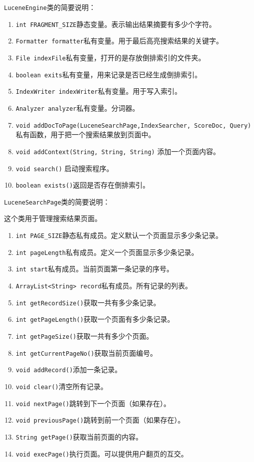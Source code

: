 \documentclass[UTF8,a4paper,12pt]{ctexart}
\begin{document}
\texttt{LuceneEngine}类的简要说明：
\begin{enumerate}[label=(\arabic*), wide=2em]
    \item \texttt{int FRAGMENT_SIZE}静态变量。表示输出结果摘要有多少个字符。
    \item \texttt{Formatter formatter}私有变量。用于最后高亮搜索结果的关键字。
    \item \texttt{File indexFile}私有变量，打开的是存放倒排索引的文件夹。
    \item \texttt{boolean exits}私有变量，用来记录是否已经生成倒排索引。
    \item \texttt{IndexWriter indexWriter}私有变量。用于写入索引。
    \item \texttt{Analyzer analyzer}私有变量。分词器。
    \item \texttt{void addDocToPage(LuceneSearchPage,IndexSearcher, ScoreDoc, Query)} 
    私有函数，用于把一个搜索结果放到页面中。
    \item \texttt{void addContext(String, String, String)} 
    添加一个页面内容。
    \item \texttt{void search()} 
    启动搜索程序。
    \item \texttt{boolean exists()}返回是否存在倒排索引。
\end{enumerate}\par
\texttt{LuceneSearchPage}类的简要说明：\par
这个类用于管理搜索结果页面。
\begin{enumerate}[label=(\arabic*), wide=2em]
    \item \texttt{int PAGE_SIZE}静态私有成员。定义默认一个页面显示多少条记录。
    \item \texttt{int pageLength}私有成员。定义一个页面显示多少条记录。
    \item \texttt{int start}私有成员。当前页面第一条记录的序号。
    \item \texttt{ArrayList<String> record}私有成员。所有记录的列表。
    \item \texttt{int getRecordSize()}获取一共有多少条记录。
    \item \texttt{int getPageLength()}获取一个页面有多少条记录。
    \item \texttt{int getPageSize()}获取一共有多少个页面。
    \item \texttt{int getCurrentPageNo()}获取当前页面编号。
    \item \texttt{void addRecord()}添加一条记录。
    \item \texttt{void clear()}清空所有记录。
    \item \texttt{void nextPage()}跳转到下一个页面（如果存在）。
    \item \texttt{void previousPage()}跳转到前一个页面（如果存在）。
    \item \texttt{String getPage()}获取当前页面的内容。
    \item \texttt{void execPage()}执行页面。可以提供用户翻页的互交。
\end{enumerate}\par
\end{document}
